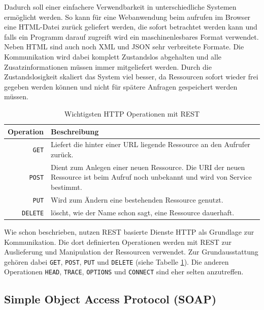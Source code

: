 Dadurch soll einer einfachere Verwendbarkeit in unterschiedliche Systemen ermöglicht werden. So kann für eine Webanwendung beim aufrufen im Browser eine HTML-Datei zurück geliefert werden, die sofort betrachtet werden kann und falls ein Programm darauf zugreift wird ein maschinenlesbares Format verwendet. Neben HTML sind auch noch XML und JSON sehr verbreitete Formate. Die Kommunikation wird dabei komplett Zustandslos abgehalten und alle Zusatzinformationen müssen immer mitgeliefert werden. Durch die Zustandslosigkeit skaliert das System viel besser, da Ressourcen sofort wieder frei gegeben werden können und nicht für spätere Anfragen gespeichert werden müssen. 


\begin{table}[ht]
\centering
\caption{Wichtigsten HTTP Operationen mit REST} 
\begin{tabular}{r|p{12cm}}
    \textbf{Operation} & 
    \textbf{Beschreibung} \\ 
    \hline
    \texttt{GET} & 
    Liefert die hinter einer URL liegende Ressource an den Aufrufer zurück.\\
    
    \texttt{POST} & 
    Dient zum Anlegen einer neuen Ressource. Die URI der neuen Ressource ist beim Aufruf noch unbekannt und wird von Service bestimmt. \\

    \texttt{PUT} & 
    Wird zum Ändern eine bestehenden Ressource genutzt. \\
    
    \texttt{DELETE} &
    löscht, wie der Name schon sagt, eine Ressource dauerhaft.
\end{tabular}
\label{tbl:rest_oprations}
\end{table} 

\medskip

Wie schon beschrieben, nutzen REST basierte Dienste HTTP als Grundlage zur Kommunikation. Die dort definierten Operationen werden mit REST zur Auslieferung und Manipulation der Ressourcen verwendet. Zur Grundausstattung  gehören dabei \texttt{GET}, \texttt{POST}, \texttt{PUT} und \texttt{DELETE} (siehe Tabelle \ref{tbl:rest_oprations}). Die anderen Operationen \texttt{HEAD}, \texttt{TRACE}, \texttt{OPTIONS} und \texttt{CONNECT} sind eher selten anzutreffen.
     

\subsection{Simple Object Access Protocol (SOAP)} %
\label{sub:soap}

